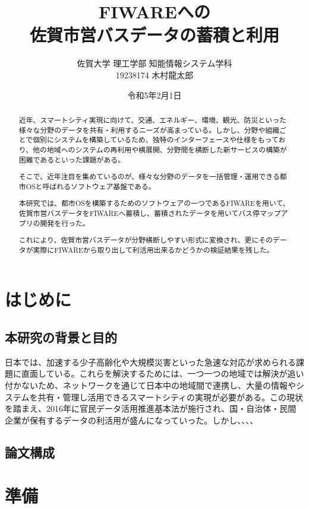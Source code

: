 \documentclass[a4paper, 12pt]{jsreport}
\title{FIWAREへの\\
佐賀市営バスデータの蓄積と利用
}
\author{佐賀大学
理工学部
知能情報システム学科\\
19238174
木村龍太郎}
\date{令和5年2月1日}
\begin{document}
  \maketitle


  \begin{abstract}
    \par 近年、スマートシティ実現に向けて、交通、エネルギー、環境、観光、防災といった様々な分野のデータを共有・利用するニーズが高まっている。しかし、分野や組織ごとで個別にシステムを構築しているため、独特のインターフェースや仕様をもっており、他の地域へのシステムの再利用や横展開、分野間を横断した新サービスの構築が困難であるといった課題がある。
    \par そこで、近年注目を集めているのが、様々な分野のデータを一括管理・運用できる都市OSと呼ばれるソフトウェア基盤である。
    \par 本研究では、都市OSを構築するためのソフトウェアの一つであるFIWAREを用いて、佐賀市営バスデータをFIWAREへ蓄積し、蓄積されたデータを用いてバス停マップアプリの開発を行った。
    \par これにより、佐賀市営バスデータが分野横断しやすい形式に変換され、更にそのデータが実際にFIWAREから取り出して利活用出来るかどうかの検証結果を残した。
  \end{abstract}

  \tableofcontents

  \chapter{はじめに}
  \section{本研究の背景と目的}
  \par 日本では、加速する少子高齢化や大規模災害といった急速な対応が求められる課題に直面している。これらを解決するためには、一つ一つの地域では解決が追い付かないため、ネットワークを通じて日本中の地域間で連携し、大量の情報やシステムを共有・管理し活用できるスマートシティの実現が必要がある。この現状を踏まえ、2016年に官民データ活用推進基本法\cite{kanmin}が施行され、国・自治体・民間企業が保有するデータの利活用が盛んになっていった。しかし、、、、
  \par

  \section{論文構成}


  \chapter{準備}
\end{document}
